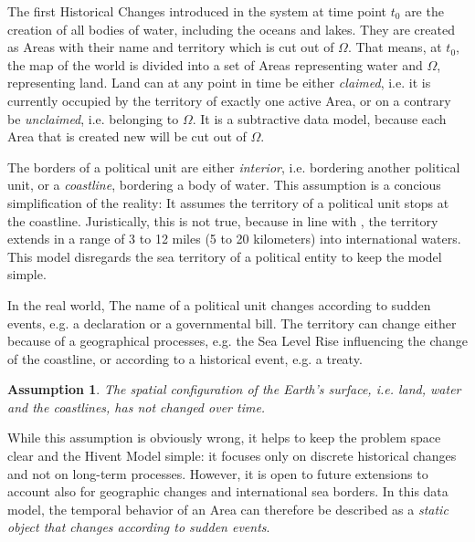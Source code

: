 The first Historical Changes introduced in the system at time point $t_0$ are the creation of all bodies of water, including the oceans and lakes. They are created as Areas with their name and territory which is cut out of $\Omega$. That means, at $t_0$, the map of the world is divided into a set of Areas representing water and $\Omega$, representing land. Land can at any point in time be either \emph{claimed}, i.e. it is currently occupied by the territory of exactly one active Area, or on a contrary be \emph{unclaimed}, i.e. belonging to $\Omega$. It is a subtractive data model, because each Area that is created new will be cut out of $\Omega$.

The borders of a political unit are either \emph{interior}, i.e. bordering another political unit, or a \emph{coastline}, bordering a body of water. This assumption is a concious simplification of the reality: It assumes the territory of a political unit stops at the coastline. Juristically, this is not true, because in line with \cite{UNSeaBorders}, the territory extends in a range of 3 to 12 miles (5 to 20 kilometers) into international waters. This model disregards the sea territory of a political entity to keep the model simple.

In the real world, The name of a political unit changes according to sudden events, e.g. a declaration or a governmental bill. The territory can change either because of a geographical processes, e.g. the Sea Level Rise influencing the change of the coastline, or according to a historical event, e.g. a treaty.

\vspace{-1.0em}
\newtheorem{constant_coastlines}[assicounter]{Assumption}
\begin{constant_coastlines}
\label{axm:constant_coastlines}
  The spatial configuration of the Earth's surface, i.e. land, water and the coastlines, has not changed over time.
\end{constant_coastlines}

While this assumption is obviously wrong, it helps to keep the problem space clear and the Hivent Model simple: it focuses only on discrete historical changes and not on long-term processes. However, it is open to future extensions to account also for geographic changes and international sea borders. In this data model, the temporal behavior of an Area can therefore be described as a \emph{static object that changes according to sudden events}.


